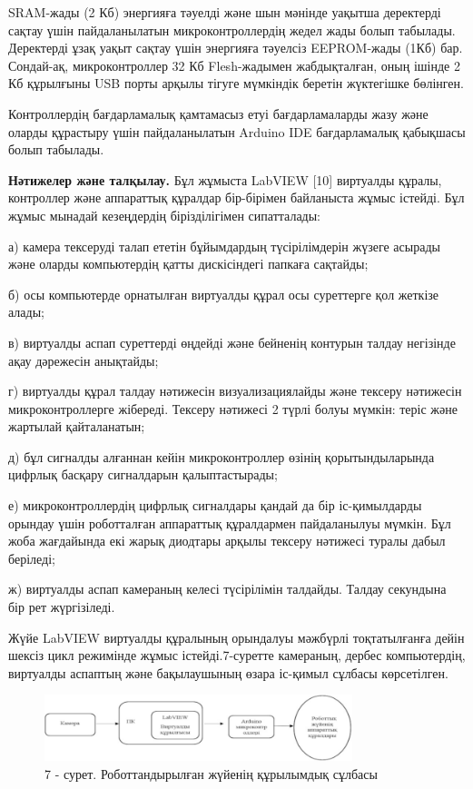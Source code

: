 \begin{multicols}{2}
SRAM-жады (2 Кб) энергияға тәуелді және шын мәнінде уақытша деректерді
сақтау үшін пайдаланылатын микроконтроллердің жедел жады болып табылады.
Деректерді ұзақ уақыт сақтау үшін энергияға тәуелсіз EEPROM-жады (1Кб)
бар. Сондай-ақ, микроконтроллер 32 Кб Flesh-жадымен жабдықталған, оның
ішінде 2 Кб құрылғыны USB порты арқылы тігуге мүмкіндік беретін
жүктегішке бөлінген.

Контроллердің бағдарламалық қамтамасыз етуі бағдарламаларды жазу және
оларды құрастыру үшін пайдаланылатын Arduino IDE бағдарламалық қабықшасы
болып табылады.

{\bfseries Нәтижелер және талқылау.} Бұл жұмыста LabVIEW {[}10{]} виртуалды
құралы, контроллер және аппараттық құралдар бір-бірімен байланыста жұмыс
істейді. Бұл жұмыс мынадай кезеңдердің бірізділігімен сипатталады:

а) камера тексеруді талап ететін бұйымдардың түсірілімдерін жүзеге
асырады және оларды компьютердің қатты дискісіндегі папкаға сақтайды;

б) осы компьютерде орнатылған виртуалды құрал осы суреттерге қол жеткізе
алады;

в) виртуалды аспап суреттерді өңдейді және бейненің контурын талдау
негізінде ақау дәрежесін анықтайды;

г) виртуалды құрал талдау нәтижесін визуализациялайды және тексеру
нәтижесін микроконтроллерге жібереді. Тексеру нәтижесі 2 түрлі болуы
мүмкін: теріс және жартылай қайталанатын;

д) бұл сигналды алғаннан кейін микроконтроллер өзінің қорытындыларында
цифрлық басқару сигналдарын қалыптастырады;

е) микроконтроллердің цифрлық сигналдары қандай да бір іс-қимылдарды
орындау үшін роботталған аппараттық құралдармен пайдаланылуы мүмкін. Бұл
жоба жағдайында екі жарық диодтары арқылы тексеру нәтижесі туралы дабыл
беріледі;

ж) виртуалды аспап камераның келесі түсірілімін талдайды. Талдау
секундына бір рет жүргізіледі.

Жүйе LabVIEW виртуалды құралының орындалуы мәжбүрлі тоқтатылғанға дейін
шексіз цикл режимінде жұмыс істейді.7-суретте камераның, дербес
компьютердің, виртуалды аспаптың және бақылаушының өзара іс-қимыл
сұлбасы көрсетілген.
\end{multicols}

\begin{figure}[H]
	\centering
	\includegraphics[width=0.8\textwidth]{media/ict2/image175}
	\caption*{7 - сурет. Роботтандырылған жүйенің құрылымдық сұлбасы}
\end{figure}

